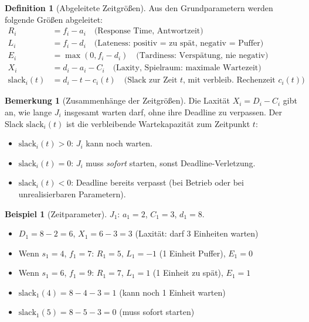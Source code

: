 ﻿\documentclass[a4paper,12pt]{report}
\theoremstyle{definition}
\newtheorem{definition}{Definition}[chapter]
\newtheorem{beispiel}{Beispiel}[chapter]
\newtheorem{bemerkung}{Bemerkung}[chapter]
\begin{document}
\begin{definition}[Abgeleitete Zeitgrößen]
	Aus den Grundparametern werden folgende Größen abgeleitet:
	\begin{align*}
		R_i &= f_i - a_i \quad\text{(Response Time, Antwortzeit)}\\
		L_i &= f_i - d_i \quad\text{(Lateness: positiv = zu spät, negativ = Puffer)}\\
		E_i &= \max(0, f_i - d_i) \quad\text{(Tardiness: Verspätung, nie negativ)}\\
		X_i &= d_i - a_i - C_i \quad\text{(Laxity, Spielraum: maximale Wartezeit)}\\
		\text{slack}_i(t) &= d_i - t - c_i(t) \quad\text{(Slack zur Zeit }t\text{,
		mit verbleib. Rechenzeit }c_i(t))
	\end{align*}
\end{definition}

\begin{bemerkung}[Zusammenhänge der Zeitgrößen]
	Die Laxität $X_i = D_i - C_i$ gibt an, wie lange $J_i$ insgesamt warten
	darf, ohne ihre Deadline zu verpassen. Der Slack $\text{slack}_i(t)$ ist
	die verbleibende Wartekapazität zum Zeitpunkt $t$:
	\begin{itemize}
		\item $\text{slack}_i(t) > 0$: $J_i$ kann noch warten.
		\item $\text{slack}_i(t) = 0$: $J_i$ muss \emph{sofort} starten, sonst
		      Deadline-Verletzung.
		\item $\text{slack}_i(t) < 0$: Deadline bereits verpasst (bei Betrieb oder
		      bei unrealisierbaren Parametern).
	\end{itemize}
\end{bemerkung}

\begin{beispiel}[Zeitparameter]
	$J_1$: $a_1=2$, $C_1=3$, $d_1=8$.
	\begin{itemize}
		\item $D_1 = 8-2 = 6$, $X_1 = 6-3 = 3$ (Laxität: darf 3 Einheiten warten)
		\item Wenn $s_1=4$, $f_1=7$: $R_1=5$, $L_1=-1$ (1 Einheit Puffer), $E_1=0$
		\item Wenn $s_1=6$, $f_1=9$: $R_1=7$, $L_1=1$ (1 Einheit zu spät), $E_1=1$
		\item $\text{slack}_1(4) = 8-4-3 = 1$ (kann noch 1 Einheit warten)
		\item $\text{slack}_1(5) = 8-5-3 = 0$ (muss sofort starten)
	\end{itemize}
\end{beispiel}
\end{document}
